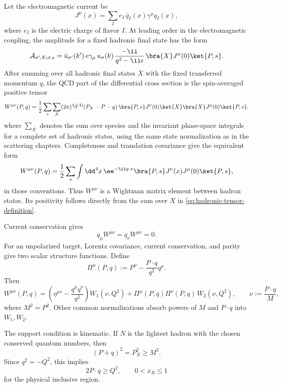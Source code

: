 Let the electromagnetic current be
\[
  J^\mu(x)=\sum_I e_I\,\bar q_I(x)\gamma^\mu q_I(x),
\]
where \(e_I\) is the electric charge of flavor \(I\).  At leading order in the
electromagnetic coupling, the amplitude for a fixed hadronic final state has
the form
\begin{equation}
  \mathcal A_{\sigma'\!,X;\sigma,s}
  =
  \bar u_{\sigma'}(k')\,e\gamma_\mu\,u_{\sigma}(k)\,
  \frac{-\ii}{q^2-\ii\epsilon}\,
  \bra{X}J^\mu(0)\ket{P,s}.
  \label{eq:qcd-dis-leading-amplitude}
\end{equation}
After summing over all hadronic final states \(X\) with the fixed transferred
momentum \(q\), the QCD part of the differential cross section is the
spin-averaged positive tensor
\begin{equation}
  W^{\mu\nu}(P,q)
  =
  \frac12\sum_s
  \sum_X (2\pi)^4\delta^{(4)}(P_X-P-q)\,
  \bra{P,s}J^\nu(0)\ket{X}
  \bra{X}J^\mu(0)\ket{P,s}.
  \label{eq:hadronic-tensor-definition}
\end{equation}
where \(\sum_X\) denotes the sum over species and the invariant phase-space
integrals for a complete set of hadronic states, using the same state
normalization as in the scattering chapters.  Completeness and translation
covariance give the equivalent form
\begin{equation}
  W^{\mu\nu}(P,q)
  =
  \frac12\sum_s
  \int\dd^4x\,\ee^{-\ii q\cdot x}
  \bra{P,s}J^\nu(x)J^\mu(0)\ket{P,s},
  \label{eq:hadronic-tensor-current-product}
\end{equation}
in those conventions.  Thus \(W^{\mu\nu}\) is a Wightman matrix element
between hadron states.  Its positivity follows directly from the sum over
\(X\) in
\eqref{eq:hadronic-tensor-definition}.

Current conservation gives
\[
  q_\mu W^{\mu\nu}=q_\nu W^{\mu\nu}=0 .
\]
For an unpolarized target, Lorentz covariance, current conservation, and
parity give two scalar structure functions.  Define
\[
  \Pi^\mu(P,q)
  :=
  P^\mu-\frac{P\cdot q}{q^2}q^\mu .
\]
Then
\begin{equation}
  W^{\mu\nu}(P,q)
  =
  \left(\eta^{\mu\nu}-\frac{q^\mu q^\nu}{q^2}\right)W_1(\nu,Q^2)
  +
  \Pi^\mu(P,q)\Pi^\nu(P,q)\,W_2(\nu,Q^2),
  \qquad
  \nu:=\frac{P\cdot q}{M},
  \label{eq:qcd-dis-tensor-decomposition}
\end{equation}
where \(M^2=P^2\).  Other common normalizations absorb powers of \(M\) and
\(P\cdot q\) into \(W_1,W_2\).

The support condition is kinematic.  If \(N\) is the lightest hadron with the
chosen conserved quantum numbers, then
\[
  (P+q)^2=P_X^2\ge M^2 .
\]
Since \(q^2=-Q^2\), this implies
\[
  2P\cdot q\ge Q^2,
  \qquad
  0<x_B\le1
\]
for the physical inclusive region.

